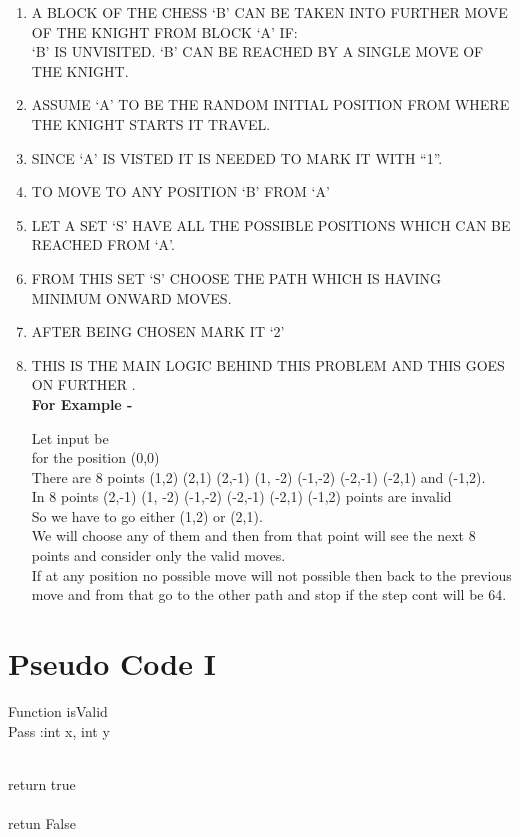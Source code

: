 \documentclass[conference]{IEEEtran}
\begin{document}
\begin{enumerate}

\item A BLOCK OF THE CHESS ‘B’ CAN BE TAKEN INTO FURTHER MOVE OF THE KNIGHT FROM BLOCK ‘A’ IF:\\

‘B’ IS UNVISITED.
‘B’ CAN BE REACHED BY A SINGLE MOVE OF THE KNIGHT.
\\

\item ASSUME ‘A’ TO BE THE RANDOM INITIAL  POSITION FROM WHERE THE KNIGHT STARTS IT TRAVEL.\\

\item SINCE ‘A’ IS VISTED IT IS NEEDED TO  MARK IT WITH “1”.
\\
\item TO MOVE TO ANY POSITION ‘B’ FROM ‘A’\\
\item LET A SET ‘S’ HAVE ALL THE POSSIBLE POSITIONS WHICH CAN BE REACHED FROM ‘A’.
\item FROM THIS SET ‘S’ CHOOSE THE PATH WHICH IS HAVING MINIMUM ONWARD MOVES.\\
\item AFTER BEING CHOSEN MARK IT ‘2’ \\
\item THIS IS THE MAIN LOGIC BEHIND THIS PROBLEM AND THIS GOES ON FURTHER .\\

\textbf{For Example - }

Let input be\\
for the position (0,0)\\

There are 8 points (1,2) (2,1) (2,-1) (1, -2) (-1,-2) (-2,-1) (-2,1) and (-1,2).\\
In 8 points (2,-1) (1, -2) (-1,-2) (-2,-1) (-2,1) (-1,2) points are invalid\\
So we have to go either (1,2) or (2,1).\\
We will choose any of them and then from that point will see the next 8 points and consider only the valid moves.\\
If at any position no possible move will not possible then back to the previous move and from that go to the other path and stop if the step cont will be 64.\\
\end{enumerate}


\section{\textbf{Pseudo Code I}} 
\noindent Function isValid \\
Pass :int x, int y\\
\bef\begin{algorithmic}
	\\
    	return true\\
	\ENDIF\\
retun False\\
\end{algorithmic}
\end{document}
